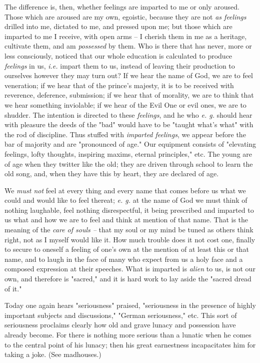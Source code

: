 \documentclass[a4paper]{book}
\begin{document}
The difference is, then, whether feelings are imparted to me or only aroused. 
Those which are aroused are my own, egoistic, because they are not \textit{as 
feelings} drilled into me, dictated to me, and pressed upon me; but those 
which are imparted to me I receive, with open arms -- I cherish them in me as 
a heritage, cultivate them, and am \textit{possessed} by them. Who is there 
that has never, more or less consciously, noticed that our whole education is 
calculated to produce \textit{feelings} in us, \textit{i.e.} impart them to 
us, instead of leaving their production to ourselves however they may turn 
out? If we hear the name of God, we are to feel veneration; if we hear that of 
the prince's majesty, it is to be received with reverence, deference, 
submission; if we hear that of morality, we are to think that we hear 
something inviolable; if we hear of the Evil One or evil ones, we are to 
shudder. The intention is directed to these \textit{feelings}, and he who 
\textit{e. g.} should hear with pleasure the deeds of the "{}bad"{} would have 
to be "{}taught what's what"{} with the rod of discipline. Thus stuffed with 
\textit{imparted feelings}, we appear before the bar of majority and are 
"{}pronounced of age."{} Our equipment consists of "{}elevating feelings, 
lofty thoughts, inspiring maxims, eternal principles,"{} etc. The young are of 
age when they twitter like the old; they are driven through school to learn 
the old song, and, when they have this by heart, they are declared of age.

We \textit{must not} feel at every thing and every name that comes before us 
what we could and would like to feel thereat; \textit{e. g.} at the name of 
God we must think of nothing laughable, feel nothing disrespectful, it being 
prescribed and imparted to us what and how we are to feel and think at mention 
of that name. That is the meaning of the \textit{care of souls --} that my 
soul or my mind be tuned as others think right, not as I myself would like it. 
How much trouble does it not cost one, finally to secure to oneself a feeling 
of one's own at the mention of at least this or that name, and to laugh in the 
face of many who expect from us a holy face and a composed expression at their 
speeches. What is imparted is \textit{alien} to us, is not our own, and 
therefore is "{}sacred,"{} and it is hard work to lay aside the "{}sacred 
dread of it."{}

Today one again hears "{}seriousness"{} praised, "{}seriousness in the 
presence of highly important subjects and discussions,"{} "{}German 
seriousness,"{} etc. This sort of seriousness proclaims clearly how old and 
grave lunacy and possession have already become. For there is nothing more 
serious than a lunatic when he comes to the central point of his lunacy; then 
his great earnestness incapacitates him for taking a joke. (See madhouses.)
\end{document}
